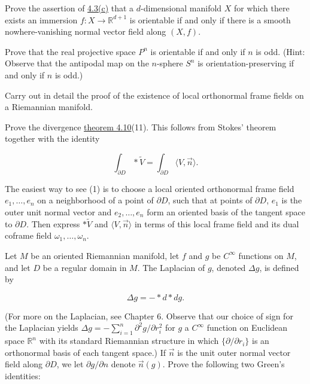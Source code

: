 \begin{problemset}

\item Prove the assertion of \hyperref[thm:4.3]{4.3(c)} that a $d$-dimensional manifold $X$ for which there exists an immersion $f: X \to \mathbb{R}^{d+1}$ is orientable if and only if there is a smooth nowhere-vanishing normal vector field along $(X,f)$.

\item Prove that the real projective space $P^{n}$ is orientable if and only if $n$ is odd. (Hint: Observe that the antipodal map on the $n$-sphere $S^{n}$ is orientation-preserving if and only if $n$ is odd.)

\item Carry out in detail the proof of the existence of local orthonormal frame fields on a Riemannian manifold.

\item Prove the divergence \hyperref[thm:4.10]{theorem 4.10}(11). This follows from Stokes' theorem together with the identity

\begin{equation}
\int_{\partial D}\ast\widetilde{V}=\int_{\partial D}\langle V,\vec{n}\rangle.
\end{equation}

The easiest way to see (1) is to choose a local oriented orthonormal frame field  $ e_1, \ldots, e_n $ on a neighborhood of a point of  $ \partial D $, such that at points of  $ \partial D $,  $ e_1 $ is the outer unit normal vector and  $ e_2, \ldots, e_n $ form an oriented basis of the tangent space to  $ \partial D $. Then express  $ *\tilde{V} $ and  $ \langle V,\vec{n} \rangle $ in terms of this local frame field and its dual coframe field  $ \omega_1, \ldots, \omega_n $.

\item Let $M$ be an oriented Riemannian manifold, let $f$ and $g$ be $C^{\infty}$ functions on $M$, and let $D$ be a regular domain in $M$. The Laplacian of $g$, denoted $\Delta g$, is defined by

\begin{equation}
\Delta g=-*d*d g.
\end{equation}

(For more on the Laplacian, see Chapter 6. Observe that our choice of sign for the Laplacian yields $\Delta g = -\sum_{i=1}^{n} \partial^{2} g/\partial r_{i}^{2}$ for $g$ a $C^{\infty}$ function on Euclidean space $\mathbb{R}^{n}$ with its standard Riemannian structure in which $\{\partial/\partial r_{i}\}$ is an orthonormal basis of each tangent space.) If $\vec{n}$ is the unit outer normal vector field along $\partial D$, we let $\partial g/\partial n$ denote $\vec{n}(g)$. Prove the following two Green's identities: 


\end{problemset}
